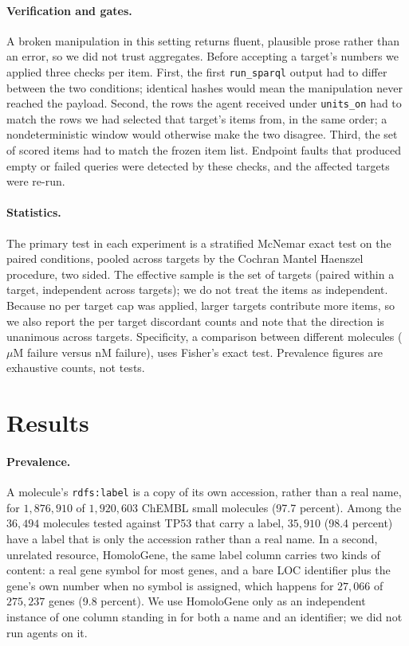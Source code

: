 \documentclass[sigconf]{ceurart}
\begin{document}
\paragraph{Verification and gates.}
A broken manipulation in this setting returns fluent, plausible prose rather than
an error, so we did not trust aggregates. Before accepting a target's numbers we
applied three checks per item. First, the first \texttt{run\_sparql} output had to
differ between the two conditions; identical hashes would mean the manipulation
never reached the payload. Second, the rows the agent received under
\texttt{units\_on} had to match the rows we had selected that target's items from,
in the same order; a nondeterministic window would otherwise make the two disagree.
Third, the set of scored items had to match the frozen item list. Endpoint faults that produced empty or failed queries were detected by
these checks, and the affected targets were re-run.

\paragraph{Statistics.}
The primary test in each experiment is a stratified McNemar exact test on the paired
conditions, pooled across targets by the Cochran Mantel Haenszel procedure, two
sided. The effective sample is the set of targets (paired within a target,
independent across targets); we do not treat the items as independent. Because no
per target cap was applied, larger targets contribute more items, so we also report
the per target discordant counts and note that the direction is unanimous across
targets. Specificity, a comparison between different molecules ($\mu$M failure versus
nM failure), uses Fisher's exact test. Prevalence figures are exhaustive counts,
not tests.

\section{Results}
\label{sec:results}

\paragraph{Prevalence.}
A molecule's \texttt{rdfs:label} is a copy of its own accession, rather than a real
name, for $1{,}876{,}910$ of $1{,}920{,}603$ ChEMBL small molecules (97.7 percent).
Among the $36{,}494$ molecules tested against TP53 that carry a label, $35{,}910$
(98.4 percent) have a label that is only the accession rather than a real name. In
a second, unrelated resource, HomoloGene, the same label column carries two kinds
of content: a real gene symbol for most genes, and a bare LOC identifier plus the
gene's own number when no symbol is assigned, which happens for $27{,}066$ of
$275{,}237$ genes (9.8 percent). We use HomoloGene only as an independent instance
of one column standing in for both a name and an identifier; we did not run agents
on it.
\end{document}
